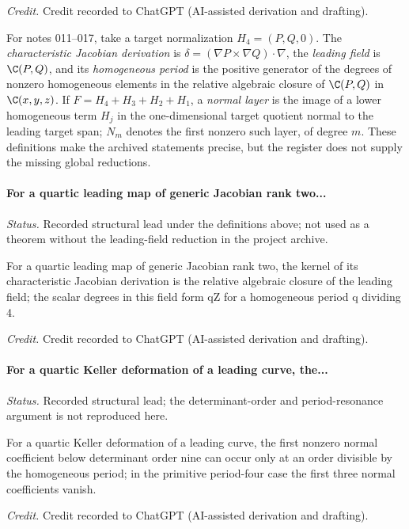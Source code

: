 \emph{Credit.} Credit recorded to ChatGPT (AI-assisted derivation and drafting).

\noindent
For notes 011--017, take a target normalization
\(H_4=(P,Q,0)\).  The \emph{characteristic Jacobian derivation} is
\(\delta=(\nabla P\times\nabla Q)\cdot\nabla\), the \emph{leading field} is
\(\C(P,Q)\), and its \emph{homogeneous period} is the positive generator
of the degrees of nonzero homogeneous elements in the relative algebraic
closure of \(\C(P,Q)\) in \(\C(x,y,z)\).  If
\(F=H_4+H_3+H_2+H_1\), a \emph{normal layer} is the image of a lower
homogeneous term \(H_j\) in the one-dimensional target quotient normal to
the leading target span; \(N_m\) denotes the first nonzero such layer, of
degree \(m\).  These definitions make the archived statements precise,
but the register does not supply the missing global reductions.

\label{supp-note-02-011}
\paragraph{For a quartic leading map of generic Jacobian rank two...}
\emph{Status.} Recorded structural lead under the definitions above; not used
as a theorem without the leading-field reduction in the project archive.

For a quartic leading map of generic Jacobian rank two, the kernel of its characteristic Jacobian derivation is the relative algebraic closure of the leading field; the scalar degrees in this field form qZ for a homogeneous period q dividing 4.

\emph{Credit.} Credit recorded to ChatGPT (AI-assisted derivation and drafting).

\label{supp-note-02-012}
\paragraph{For a quartic Keller deformation of a leading curve, the...}
\emph{Status.} Recorded structural lead; the determinant-order and
period-resonance argument is not reproduced here.

For a quartic Keller deformation of a leading curve, the first nonzero normal coefficient below determinant order nine can occur only at an order divisible by the homogeneous period; in the primitive period-four case the first three normal coefficients vanish.

\emph{Credit.} Credit recorded to ChatGPT (AI-assisted derivation and drafting).

